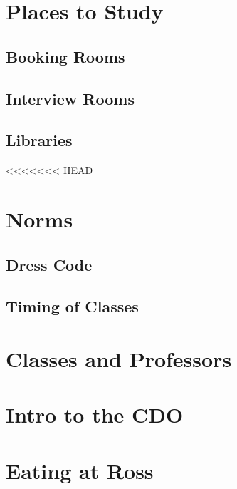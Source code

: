 \documentclass[
]{book}
\begin{document}
\hypertarget{places-to-study}{%
\chapter{Places to Study}\label{places-to-study}}

\hypertarget{booking-rooms}{%
\section{Booking Rooms}\label{booking-rooms}}

\hypertarget{interview-rooms}{%
\section{Interview Rooms}\label{interview-rooms}}

\hypertarget{libraries}{%
\section{Libraries}\label{libraries}}

<<<<<<< HEAD
\hypertarget{norms}{%
\chapter{Norms}\label{norms}}

\hypertarget{dress-code}{%
\section{Dress Code}\label{dress-code}}

\hypertarget{timing-of-classes}{%
\section{Timing of Classes}\label{timing-of-classes}}

\hypertarget{classes-and-professors}{%
\chapter{Classes and Professors}\label{classes-and-professors}}

\hypertarget{intro-to-the-cdo}{%
\chapter{Intro to the CDO}\label{intro-to-the-cdo}}

\hypertarget{eating-at-ross}{%
\chapter{Eating at Ross}\label{eating-at-ross}}
\end{document}
